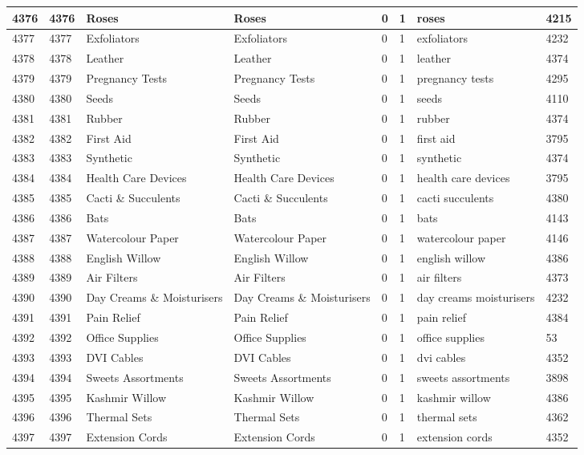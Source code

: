 \begin{longtable}{|l|l|l|l|l|l|l|l|}
4376 & 4376 & Roses & Roses & 0 & 1 & roses & 4215 \\ \hline 
4377 & 4377 & Exfoliators & Exfoliators & 0 & 1 & exfoliators & 4232 \\ \hline 
4378 & 4378 & Leather & Leather & 0 & 1 & leather & 4374 \\ \hline 
4379 & 4379 & Pregnancy Tests & Pregnancy Tests & 0 & 1 & pregnancy tests & 4295 \\ \hline 
4380 & 4380 & Seeds & Seeds & 0 & 1 & seeds & 4110 \\ \hline 
4381 & 4381 & Rubber & Rubber & 0 & 1 & rubber & 4374 \\ \hline 
4382 & 4382 & First Aid & First Aid & 0 & 1 & first aid & 3795 \\ \hline 
4383 & 4383 & Synthetic & Synthetic & 0 & 1 & synthetic & 4374 \\ \hline 
4384 & 4384 & Health Care Devices & Health Care Devices & 0 & 1 & health care devices & 3795 \\ \hline 
4385 & 4385 & Cacti \& Succulents & Cacti \& Succulents & 0 & 1 & cacti succulents & 4380 \\ \hline 
4386 & 4386 & Bats & Bats & 0 & 1 & bats & 4143 \\ \hline 
4387 & 4387 & Watercolour Paper & Watercolour Paper & 0 & 1 & watercolour paper & 4146 \\ \hline 
4388 & 4388 & English Willow & English Willow & 0 & 1 & english willow & 4386 \\ \hline 
4389 & 4389 & Air Filters & Air Filters & 0 & 1 & air filters & 4373 \\ \hline 
4390 & 4390 & Day Creams \& Moisturisers & Day Creams \& Moisturisers & 0 & 1 & day creams moisturisers & 4232 \\ \hline 
4391 & 4391 & Pain Relief & Pain Relief & 0 & 1 & pain relief & 4384 \\ \hline 
4392 & 4392 & Office Supplies & Office Supplies & 0 & 1 & office supplies & 53 \\ \hline 
4393 & 4393 & DVI Cables & DVI Cables & 0 & 1 & dvi cables & 4352 \\ \hline 
4394 & 4394 & Sweets Assortments & Sweets Assortments & 0 & 1 & sweets assortments & 3898 \\ \hline 
4395 & 4395 & Kashmir Willow & Kashmir Willow & 0 & 1 & kashmir willow & 4386 \\ \hline 
4396 & 4396 & Thermal Sets & Thermal Sets & 0 & 1 & thermal sets & 4362 \\ \hline 
4397 & 4397 & Extension Cords & Extension Cords & 0 & 1 & extension cords & 4352 \\ \hline 

\end{longtable}
